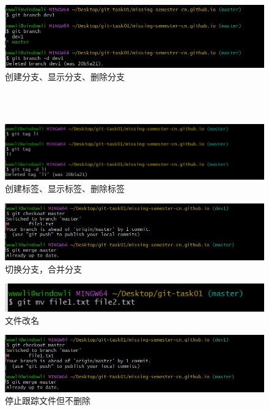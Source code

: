 \documentclass[a4paper, 12pt]{article}
\begin{document}
  \begin{figure}[H]
  \centering
  \includegraphics[width=1\textwidth]{屏幕截图 2024-08-28 194454.png}
  \caption{创建分支、显示分支、删除分支}
    \end{figure}
 \\
  \\  
  \begin{figure}[H]
  \centering
  \includegraphics[width=1\textwidth]{屏幕截图 2024-08-28 195638.png}
  \caption{创建标签、显示标签、删除标签}
    \end{figure}
    
    \begin{figure}[H]
  \centering
  \includegraphics[width=1\textwidth]{屏幕截图 2024-08-28 201335.png}
  \caption{切换分支，合并分支}
    \end{figure}

 \begin{figure}[H]
  \centering
  \includegraphics[width=1\textwidth]{屏幕截图 2024-08-29 100431.png}
  \caption{文件改名}
    \end{figure}
    
 \begin{figure}[H]
  \centering
  \includegraphics[width=1\textwidth]{屏幕截图 2024-08-28 201335.png}
  \caption{停止跟踪文件但不删除}
    \end{figure}
\end{document}
